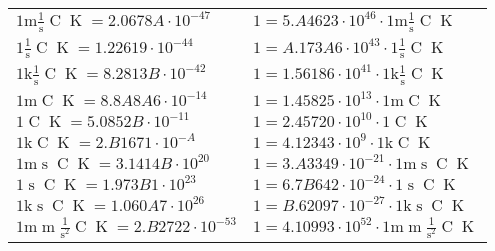 \begin{center}
\begin{longtable}{l l}
{\color{gray}$1 \bm{\mathrm{ m}}{}\frac1{\operatorname{s}}{\operatorname{C}}{\operatorname{K}} = 2.0678A\cdot10^{-47} $}   & {\color{gray}$ 1 = 5.A4623\cdot10^{46} \cdot 1 \bm{\mathrm{ m}}{}\frac1{\operatorname{s}}{\operatorname{C}}{\operatorname{K}}$}  \\
{\color{black}$1 \bm{\mathrm{ }}{}\frac1{\operatorname{s}}{\operatorname{C}}{\operatorname{K}} = 1.22619\cdot10^{-44} $}   & {\color{black}$ 1 = A.173A6\cdot10^{43} \cdot 1 \bm{\mathrm{ }}{}\frac1{\operatorname{s}}{\operatorname{C}}{\operatorname{K}}$}  \\
{\color{gray}$1 \bm{\mathrm{ k}}{}\frac1{\operatorname{s}}{\operatorname{C}}{\operatorname{K}} = 8.2813B\cdot10^{-42} $}   & {\color{gray}$ 1 = 1.56186\cdot10^{41} \cdot 1 \bm{\mathrm{ k}}{}\frac1{\operatorname{s}}{\operatorname{C}}{\operatorname{K}}$}  \\
{\color{gray}$1 \bm{\mathrm{ m}}{}{}{\operatorname{C}}{\operatorname{K}} = 8.8A8A6\cdot10^{-14} $}   & {\color{gray}$ 1 = 1.45825\cdot10^{13} \cdot 1 \bm{\mathrm{ m}}{}{}{\operatorname{C}}{\operatorname{K}}$}  \\
{\color{black}$1 \bm{\mathrm{ }}{}{}{\operatorname{C}}{\operatorname{K}} = 5.0852B\cdot10^{-11} $}   & {\color{black}$ 1 = 2.45720\cdot10^{10} \cdot 1 \bm{\mathrm{ }}{}{}{\operatorname{C}}{\operatorname{K}}$}  \\
{\color{gray}$1 \bm{\mathrm{ k}}{}{}{\operatorname{C}}{\operatorname{K}} = 2.B1671\cdot10^{-A} $}   & {\color{gray}$ 1 = 4.12343\cdot10^{9} \cdot 1 \bm{\mathrm{ k}}{}{}{\operatorname{C}}{\operatorname{K}}$}  \\
{\color{gray}$1 \bm{\mathrm{ m}}{}{\operatorname{s}}{\operatorname{C}}{\operatorname{K}} = 3.1414B\cdot10^{20} $}   & {\color{gray}$ 1 = 3.A3349\cdot10^{-21} \cdot 1 \bm{\mathrm{ m}}{}{\operatorname{s}}{\operatorname{C}}{\operatorname{K}}$}  \\
{\color{black}$1 \bm{\mathrm{ }}{}{\operatorname{s}}{\operatorname{C}}{\operatorname{K}} = 1.973B1\cdot10^{23} $}   & {\color{black}$ 1 = 6.7B642\cdot10^{-24} \cdot 1 \bm{\mathrm{ }}{}{\operatorname{s}}{\operatorname{C}}{\operatorname{K}}$}  \\
{\color{gray}$1 \bm{\mathrm{ k}}{}{\operatorname{s}}{\operatorname{C}}{\operatorname{K}} = 1.060A7\cdot10^{26} $}   & {\color{gray}$ 1 = B.62097\cdot10^{-27} \cdot 1 \bm{\mathrm{ k}}{}{\operatorname{s}}{\operatorname{C}}{\operatorname{K}}$}  \\
{\color{gray}$1 \bm{\mathrm{ m}}{\operatorname{m}}\frac1{\operatorname{s}^2}{\operatorname{C}}{\operatorname{K}} = 2.B2722\cdot10^{-53} $}   & {\color{gray}$ 1 = 4.10993\cdot10^{52} \cdot 1 \bm{\mathrm{ m}}{\operatorname{m}}\frac1{\operatorname{s}^2}{\operatorname{C}}{\operatorname{K}}$}  \\

\end{longtable}
\end{center}
